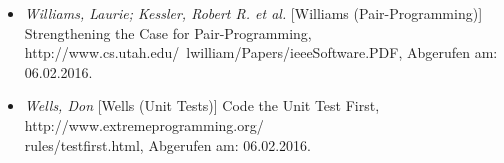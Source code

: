 \begin{itemize}
    \item[] \emph{Williams, Laurie; Kessler, Robert R. et al.} [Williams (Pair-Programming)] Strengthening the Case for Pair-Programming, http://www.cs.utah.edu/~lwilliam/Papers/ieeeSoftware.PDF, Abgerufen am: 06.02.2016.

    \item[] \emph{Wells, Don} [Wells (Unit Tests)] Code the Unit Test First, http://www.extremeprogramming.org/\\rules/testfirst.html, Abgerufen am: 06.02.2016.

\end{itemize}
